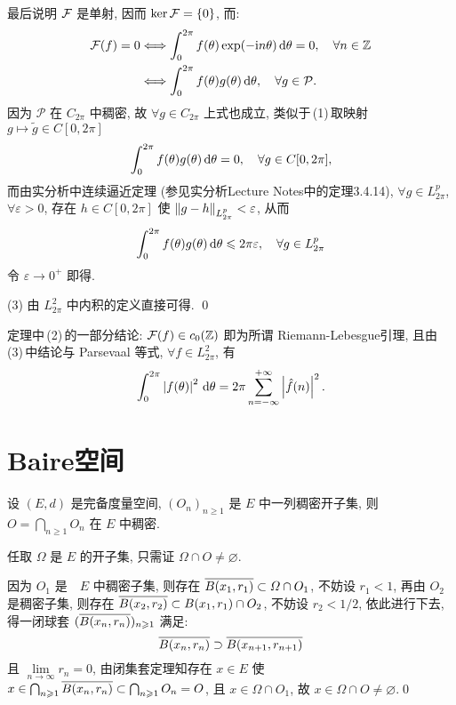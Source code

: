 \begin{Proof}
		最后说明 $ \CF $ 是单射, 因而 $ \ker \CF=\{ 0 \} $, 而:
		\[
			\begin{aligned}
				\CF(f)=0 & \Longleftrightarrow \int_{0}^{2\pi}f(\theta)\exp(-\imag n\theta)\diff\theta=0, \quad\forall n\in\Z\\
				& \Longleftrightarrow\int_{0}^{2\pi}f(\theta)g(\theta)\diff\theta, \quad \forall g\in\mathcal{P}.
			\end{aligned}
		\]
		因为 $ \mathcal{P} $ 在 $ C_{2\pi} $ 中稠密, 故 $ \forall g\in C_{2\pi} $ 上式也成立, 类似于\,(1)\,取映射 $ g\mapsto\tilde{g}\in C[0, 2\pi] $
		\[
			\int_{0}^{2\pi}f(\theta)g(\theta)\diff\theta=0, \quad \forall g\in C[0, 2\pi],
		\]
		而由实分析中连续逼近定理 (参见实分析Lecture Notes中的定理3.4.14), $ \forall g\in L_{2\pi}^{p} $, $ \forall\varepsilon>0 $, 存在 $ h\in C[0, 2\pi] $ 使 $ \norm{g-h}_{L_{2\pi}^{p}}<\varepsilon $, 从而
		\[
			\int_{0}^{2\pi}f(\theta)g(\theta)\diff\theta\leqslant 2\pi\varepsilon, \quad \forall g\in L_{2\pi}^{p}
		\]
		令 $ \varepsilon\to 0^{+} $ 即得.

		(3) 由 $ L_{2\pi}^{2} $ 中内积的定义直接可得. \qed
	\end{Proof}

	\begin{Remark}
		定理中\,(2)\,的一部分结论: $ \CF(f)\in c_{0}(\Z) $ 即为所谓 Riemann-Lebesgue引理, 且由\,(3)\,中结论与 Parsevaal 等式, $\forall f\in L_{2\pi}^{2}$, 有
		\[
			\int_{0}^{2\pi}\abs{f(\theta)}^{2}\diff\theta=2\pi\sum_{n=-\infty}^{+\infty}\abs{\hat{f}(n)}^{2}.
		\]
	\end{Remark}


\section{Baire空间}
	\begin{Theorem}[Baire]
		设 $ (E, d) $ 是完备度量空间,  $ (O_{n})_{n\geqslant1} $ 是 $ E $ 中一列稠密开子集, 则 $ O=\bigcap_{n\geqslant1}O_{n} $ 在 $ E $ 中稠密.  
	\end{Theorem}
	\begin{Proof}
		任取 $ \varOmega $ 是 $ E $ 的开子集, 只需证 $ \varOmega\cap O\ne\varnothing $.

		因为 $ O_{1} $ 是　$ E $ 中稠密子集, 则存在 $ \baro{B(x_{1}, r_{1})}\subset \varOmega\cap O_{1} $, 不妨设 $ r_{1}<1 $, 再由 $ O_{2} $ 是稠密子集, 则存在 $ \baro{B(x_{2}, r_{2})}\subset B(x_{1}, r_{1})\cap O_{2} $, 不妨设 $ r_{2}<1/2 $, 依此进行下去, 得一闭球套 $ (\baro{B(x_{n}, r_{n})})_{n\geqslant1} $ 满足:
		\[
			\baro{B(x_{n}, r_{n})}\supset \baro{B(x_{n+1}, r_{n+1})}
		\]
		且 $ \lim\limits_{n\to\infty}r_{n}=0 $, 由闭集套定理知存在 $ x\in E $ 使 $ x\in\bigcap_{n\geqslant1}\baro{B(x_{n}, r_{n})}\subset\bigcap_{n\geqslant1}O_{n}=O $, 且 $ x\in\varOmega\cap O_{1} $, 故 $ x\in\varOmega\cap O\ne\varnothing $.\qed
	\end{Proof}

